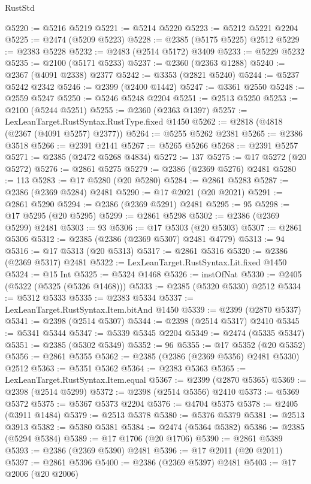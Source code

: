 \begin{lexlean}{RustStd}
\begin{coremodule}
@5220 := @5216 @5219
@5221 := @5214 @5220
@5223 := @5212 @5221 @2204
@5225 := @2474 (@5209 @5223)
@5228 := @2385 (@5175 @5225) @2512
@5229 := @2383 @5228
@5232 := @2483 (@2514 @5172) @3409
@5233 := @5229 @5232
@5235 := @2100 (@5171 @5233)
@5237 := @2360 (@2363 @1288)
@5240 := @2367 (@4091 @2338) @2377
@5242 := @3353 (@2821 @5240)
@5244 := @5237 @5242 @2342
@5246 := @2399 (@2400 @1442)
@5247 := @3361 @2550
@5248 := @2559 @5247
@5250 := @5246 @5248 @2204
@5251 := @2513 @5250
@5253 := @2100 (@5244 @5251)
@5255 := @2360 (@2363 @1397)
@5257 := LexLeanTarget.RustSyntax.RustType.fixed @1450
@5262 := @2818 (@4818 (@2367 (@4091 @5257) @2377))
@5264 := @5255 @5262 @2381
@5265 := @2386 @3518
@5266 := @2391 @2141
@5267 := @5265 @5266
@5268 := @2391 @5257
@5271 := @2385 (@2472 @5268 @4834)
@5272 := 137
@5275 := @17 @5272 (@20 @5272)
@5276 := @2861 @5275
@5279 := @2386 (@2369 @5276) @2481
@5280 := 113
@5283 := @17 @5280 (@20 @5280)
@5284 := @2861 @5283
@5287 := @2386 (@2369 @5284) @2481
@5290 := @17 @2021 (@20 @2021)
@5291 := @2861 @5290
@5294 := @2386 (@2369 @5291) @2481
@5295 := 95
@5298 := @17 @5295 (@20 @5295)
@5299 := @2861 @5298
@5302 := @2386 (@2369 @5299) @2481
@5303 := 93
@5306 := @17 @5303 (@20 @5303)
@5307 := @2861 @5306
@5312 := @2385 (@2386 (@2369 @5307) @2481 @4779)
@5313 := 94
@5316 := @17 @5313 (@20 @5313)
@5317 := @2861 @5316
@5320 := @2386 (@2369 @5317) @2481
@5322 := LexLeanTarget.RustSyntax.Lit.fixed @1450
@5324 := @15 Int
@5325 := @5324 @1468
@5326 := instOfNat
@5330 := @2405 (@5322 (@5325 (@5326 @1468)))
@5333 := @2385 (@5320 @5330) @2512
@5334 := @5312 @5333
@5335 := @2383 @5334
@5337 := LexLeanTarget.RustSyntax.Item.bitAnd @1450
@5339 := @2399 (@2870 @5337)
@5341 := @2398 (@2514 @5307)
@5344 := @2398 (@2514 @5317) @2410
@5345 := @5341 @5344
@5347 := @5339 @5345 @2204
@5349 := @2474 (@5335 @5347)
@5351 := @2385 (@5302 @5349)
@5352 := 96
@5355 := @17 @5352 (@20 @5352)
@5356 := @2861 @5355
@5362 := @2385 (@2386 (@2369 @5356) @2481 @5330) @2512
@5363 := @5351 @5362
@5364 := @2383 @5363
@5365 := LexLeanTarget.RustSyntax.Item.equal
@5367 := @2399 (@2870 @5365)
@5369 := @2398 (@2514 @5299)
@5372 := @2398 (@2514 @5356) @2410
@5373 := @5369 @5372
@5375 := @5367 @5373 @2204
@5376 := @4704 @5375
@5378 := @2405 (@3911 @1484)
@5379 := @2513 @5378
@5380 := @5376 @5379
@5381 := @2513 @3913
@5382 := @5380 @5381
@5384 := @2474 (@5364 @5382)
@5386 := @2385 (@5294 @5384)
@5389 := @17 @1706 (@20 @1706)
@5390 := @2861 @5389
@5393 := @2386 (@2369 @5390) @2481
@5396 := @17 @2011 (@20 @2011)
@5397 := @2861 @5396
@5400 := @2386 (@2369 @5397) @2481
@5403 := @17 @2006 (@20 @2006)

\end{coremodule}
\end{lexlean}
